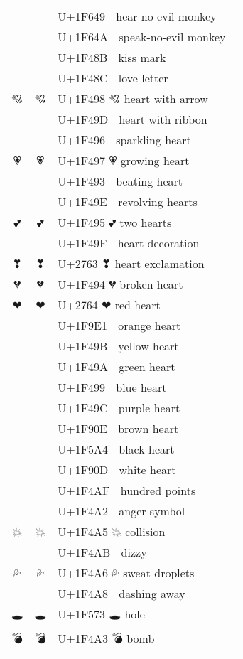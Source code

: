 \documentclass[a4paper,12pt]{ltjarticle}
\newcommand{\fontA}[1]{{\fontspec[RawFeature={mode=harf,dist,ccmp}]{Segoe UI Emoji} #1}}
\newcommand{\fontB}[1]{{\fontspec[RawFeature={mode=harf,dist,ccmp}]{Noto Color Emoji} #1}}
\begin{document}
\begin{longtable}[c]{ccp{0.8\linewidth}}
\fontA{🙉}&\fontB{🙉}&U+1F649 🙉 hear-no-evil monkey\\
\fontA{🙊}&\fontB{🙊}&U+1F64A 🙊 speak-no-evil monkey\\
\fontA{💋}&\fontB{💋}&U+1F48B 💋 kiss mark\\
\fontA{💌}&\fontB{💌}&U+1F48C 💌 love letter\\
\fontA{💘}&\fontB{💘}&U+1F498 💘 heart with arrow\\
\fontA{💝}&\fontB{💝}&U+1F49D 💝 heart with ribbon\\
\fontA{💖}&\fontB{💖}&U+1F496 💖 sparkling heart\\
\fontA{💗}&\fontB{💗}&U+1F497 💗 growing heart\\
\fontA{💓}&\fontB{💓}&U+1F493 💓 beating heart\\
\fontA{💞}&\fontB{💞}&U+1F49E 💞 revolving hearts\\
\fontA{💕}&\fontB{💕}&U+1F495 💕 two hearts\\
\fontA{💟}&\fontB{💟}&U+1F49F 💟 heart decoration\\
\fontA{❣}&\fontB{❣}&U+2763 ❣ heart exclamation\\
\fontA{💔}&\fontB{💔}&U+1F494 💔 broken heart\\
\fontA{❤}&\fontB{❤}&U+2764 ❤ red heart\\
\fontA{🧡}&\fontB{🧡}&U+1F9E1 🧡 orange heart\\
\fontA{💛}&\fontB{💛}&U+1F49B 💛 yellow heart\\
\fontA{💚}&\fontB{💚}&U+1F49A 💚 green heart\\
\fontA{💙}&\fontB{💙}&U+1F499 💙 blue heart\\
\fontA{💜}&\fontB{💜}&U+1F49C 💜 purple heart\\
\fontA{🤎}&\fontB{🤎}&U+1F90E 🤎 brown heart\\
\fontA{🖤}&\fontB{🖤}&U+1F5A4 🖤 black heart\\
\fontA{🤍}&\fontB{🤍}&U+1F90D 🤍 white heart\\
\fontA{💯}&\fontB{💯}&U+1F4AF 💯 hundred points\\
\fontA{💢}&\fontB{💢}&U+1F4A2 💢 anger symbol\\
\fontA{💥}&\fontB{💥}&U+1F4A5 💥 collision\\
\fontA{💫}&\fontB{💫}&U+1F4AB 💫 dizzy\\
\fontA{💦}&\fontB{💦}&U+1F4A6 💦 sweat droplets\\
\fontA{💨}&\fontB{💨}&U+1F4A8 💨 dashing away\\
\fontA{🕳}&\fontB{🕳}&U+1F573 🕳 hole\\
\fontA{💣}&\fontB{💣}&U+1F4A3 💣 bomb\\

\end{longtable}
\end{document}
